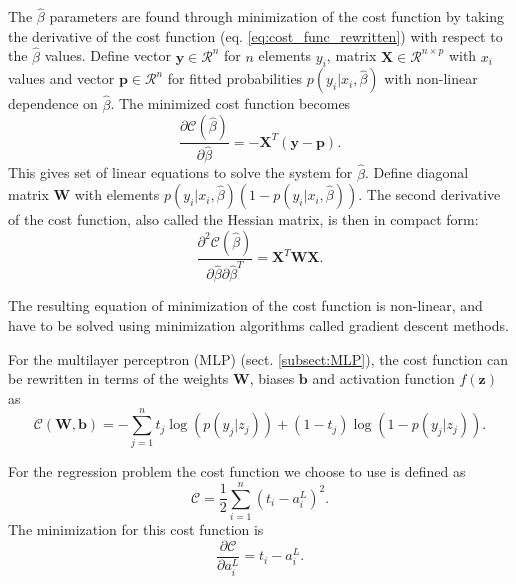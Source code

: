 \documentclass[12pt,a4paper,english]{article}
\begin{document}
The $\hat{\beta}$ parameters are found through minimization of the cost function by taking the derivative of the cost function (eq. \ref{eq:cost_func_rewritten}) with respect to the $\hat{\beta}$ values. Define vector $\textbf{y}\in\mathcal{R}^n$ for $n$ elements $y_i$, matrix $\textbf{X}\in\mathcal{R}^{n\times p}$ with $x_i$ values and vector $\textbf{p}\in\mathcal{R}^n$ for fitted probabilities $p(y_i|x_i,\hat{\beta})$ with non-linear dependence on $\hat{\beta}$. The minimized cost function becomes
\begin{equation}
\label{eq:min_cost_func}
\frac{\partial \mathcal{C}(\hat{\beta})}{\partial \hat{\beta}}=-\textbf{X}^T(\textbf{y}-\textbf{p}).
\end{equation}
This gives set of linear equations to solve the system for $\hat{\beta}$. Define diagonal matrix \textbf{W} with elements $p(y_i|x_i,\hat{\beta})(1-p(y_i|x_i,\hat{\beta}))$. The second derivative of the cost function, also called the Hessian matrix, is then in compact form:
\begin{equation}
\label{eq:Hessian}
\frac{\partial^2 \mathcal{C}(\hat{\beta})}{\partial \hat{\beta}\partial \hat{\beta}^T}=\textbf{X}^T\textbf{W}\textbf{X}.
\end{equation}

The resulting equation of minimization of the cost function is non-linear, and have to be solved using minimization algorithms called gradient descent methods.

For the multilayer perceptron (MLP) (sect. \ref{subsect:MLP}), the cost function can be rewritten in terms of the weights $\textbf{W}$, biases $\textbf{b}$ and activation function $f(\textbf{z})$ as
\begin{equation}
\label{eq:cost_MLP}
\mathcal{C}(\textbf{W},\textbf{b})=-\sum_{j=1}^{n}t_j\log(p(y_j|z_j))+(1-t_j)\log(1-p(y_j|z_j)).
\end{equation}

For the regression problem the cost function we choose to use is defined as
\begin{equation}
\label{eq:C_reg}
\mathcal{C}=\frac{1}{2}\sum_{i=1}^{n}(t_i-a^L_i)^2.
\end{equation}
The minimization for this cost function is
\begin{equation}
\label{eq:C_reg_deriv}
\frac{\partial \mathcal{C}}{\partial a^L_i}=t_i-a^L_i.
\end{equation}
\end{document}
